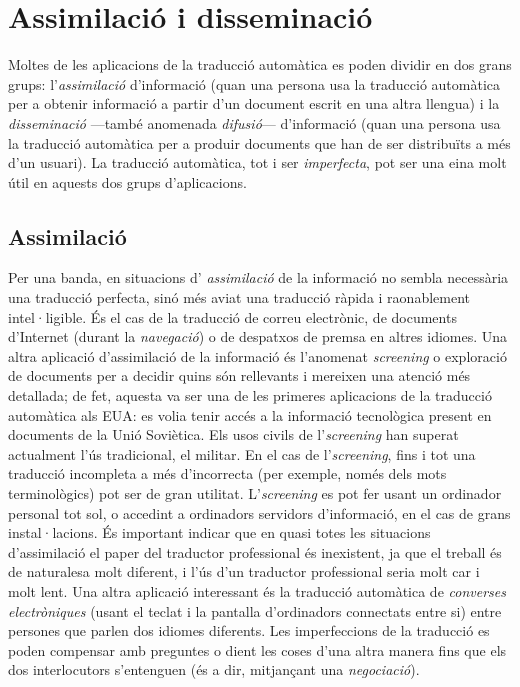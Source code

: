 \section{Assimilació i disseminació} 

Moltes de les aplicacions de la traducció automàtica es poden dividir
en dos grans grups: l'\emph{assimilació} d'informació (quan una persona
usa la traducció automàtica per a obtenir informació a partir d'un
document escrit en una altra llengua) i la \emph{disseminació} ---també
anomenada \emph{difusió}--- d'informació (quan una persona usa la
traducció automàtica per a produir documents que han de ser
distribuïts a més d'un usuari).  La traducció automàtica, tot i ser
\emph{imperfecta}, pot ser una eina molt útil en aquests dos grups
d'aplicacions.

\subsection{Assimilació} 
\label{s3:assim}
Per una banda, en situacions d'{\em
assimilació} de la informació no sembla necessària una
traducció perfecta, sinó més aviat una traducció ràpida
i raonablement intel·ligible. És el cas de la traducció de
correu electrònic, de documents d'Internet (durant la \emph{navegació})
o de despatxos de premsa
en altres idiomes.  Una altra aplicació d'assimilació de la
informació és l'anomenat \emph{screening} o exploració de
documents per a decidir quins són rellevants i mereixen una atenció
més detallada; de fet, aquesta va ser una de les primeres aplicacions de la
traducció automàtica als EUA: es volia tenir accés a la
informació tecnològica present en documents de la Unió
Soviètica. Els usos civils de l'\emph{screening} han superat actualment
l'ús tradicional, el militar. En el cas de l'\emph{screening}, fins i tot
una traducció incompleta a més d'incorrecta (per exemple, només
dels mots terminològics) pot ser de gran utilitat.  L'\emph{screening} es
pot fer usant un ordinador personal tot sol, o accedint a ordinadors
servidors d'informació, en el cas de grans instal·lacions. És
important indicar que en quasi totes les situacions d'assimilació el
paper del traductor professional és inexistent, ja que el treball és
de naturalesa molt diferent, i l'ús d'un traductor professional seria
molt car i molt lent.  Una altra aplicació interessant és la
traducció automàtica de \emph{converses electròniques} (usant
el teclat i
la pantalla d'ordinadors connectats entre si) 
entre persones que parlen dos idiomes diferents. Les imperfeccions
de la traducció es poden compensar amb preguntes o dient les coses d'una
altra manera fins que els dos interlocutors s'entenguen (és a dir,
mitjançant una \emph{negociació}).

